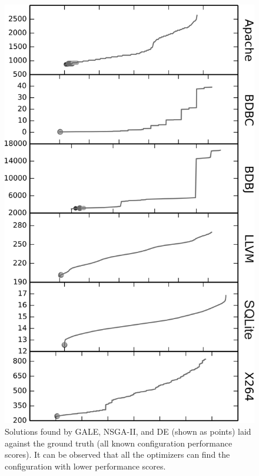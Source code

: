 \documentclass[smallextended]{svjour3}       %
\begin{document}
\begin{figure}[tb]
\centering
\includegraphics[width=\columnwidth]{Figures/optimizer_result}
\caption{Solutions found by GALE, NSGA-II, and DE (shown as points) laid against the ground truth (all known configuration performance scores). 
It can be observed that all the optimizers can find the configuration with  lower performance scores.}\label{fig:performance_graph}
\end{figure}
\end{document}
